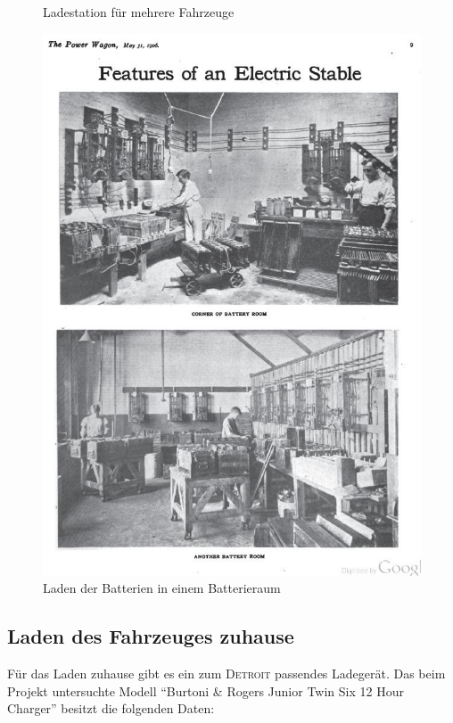 \begin{landscape}
\begin{figure}
\begin{minipage}{0.65\textwidth}
	\caption{Ladestation für mehrere Fahrzeuge \cite{laden_alt}}
	\label{fig:Laden_Garage}
\end{minipage}
\begin{minipage}{0.65\textwidth}
	\includegraphics[width=\textwidth]{images/Laden_Batterieraum.jpg}
	\caption{Laden der Batterien in einem Batterieraum \cite{laden_alt}}
	\label{fig:Laden_Batterieraum}
\end{minipage}
\end{figure}
\end{landscape}

\subsection{Laden des Fahrzeuges zuhause}
Für das Laden zuhause gibt es ein zum \textsc{Detroit} passendes Ladegerät. Das beim Projekt untersuchte Modell "`Burtoni \& Rogers Junior Twin Six 12 Hour Charger"' besitzt die folgenden Daten:

